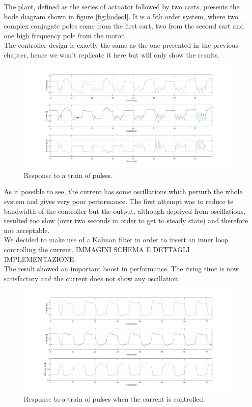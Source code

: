 The plant, defined as the series of actuator followed by two carts, presents the bode diagram shown in figure \ref{fig:bodeol}. It is a 5th order system, where two complex conjugate poles come from the first cart, two from the second cart and one high frequency pole from the motor.\\

The controller design is exactly the same as the one presented in the previous chapter, hence we won't replicate it here but will only show the results.\\


\begin{figure}[h]
\centering
\includegraphics[width=0.9\linewidth]{img/hinf_nocurr}
\caption{Response to a train of pulses.}
\label{fig:hinfnocurr}
\end{figure}

As it possible to see, the current has some oscillations which perturb the whole system and gives very poor performance. The first attempt was to reduce te bandwidth of the controller but the output, although deprived from oscillations, resulted too slow (over two seconds in order to get to steady state) and therefore not acceptable.\\

We decided to make use of a Kalman filter in order to insert an inner loop controlling the current. IMMAGINI SCHEMA E DETTAGLI IMPLEMENTAZIONE. \\

The result showed an important boost in performance. The rising time is now satisfactory and the current does not show any oscillation.\\

\begin{figure}[h]
	\centering
	\includegraphics[width=0.9\linewidth]{img/hinf_curr}
	\caption{Response to a train of pulses when the current is controlled.}
	\label{fig:hinfnocurr}
\end{figure}

